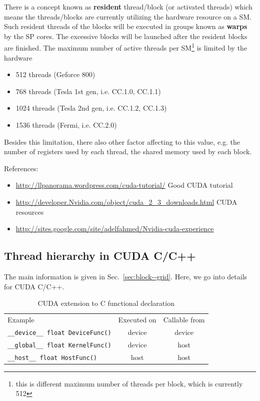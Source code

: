 There is a concept known as {\bf resident} thread/block (or activated
threads) which means the threads/blocks are currently utilizing the
hardware resource on a SM. Such resident threads of the blocks will be
executed in groups known as {\bf warps} by the SP cores. The excessive
blocks will be launched after the resident blocks are finished.  The
maximum number of active threads per
SM\footnote{this is different maximum number of threads per block,
  which is currently 512} is limited by the hardware
\begin{itemize}
\item 512 threads (Geforce 800)
\item 768 threads (Tesla 1st gen, i.e. CC.1.0, CC.1.1)
\item 1024 threads (Tesla 2nd gen, i.e. CC.1.2, CC.1.3)
\item 1536 threads (Fermi, i.e. CC.2.0)
\end{itemize}
Besides this limitation, there also other factor affecting to this
value, e.g. the number of registers used by each thread, the shared
memory used by each block. 

References:
\begin{itemize}
\item \url{http://llpanorama.wordpress.com/cuda-tutorial/} Good CUDA
  tutorial
\item \url{http://developer.Nvidia.com/object/cuda_2_3_downloads.html}
  CUDA resources
\item \url{http://sites.google.com/site/adelfahmed/Nvidia-cuda-experience}
\end{itemize}


\subsection{Thread hierarchy in CUDA C/C++}
\label{sec:cudac_thread-hierarchy}

The main information is given in Sec.~\ref{sec:block--grid}. Here, we go
into details for CUDA C/C++.

\begin{table}[hbt]
\begin{center}
\caption{CUDA extension to C functional declaration}
\begin{tabular}{lcc} 
\hline
Example & Executed on & Callable from \\ 
\verb!__device__ float DeviceFunc()! & device & device \\
\verb!__global__ float KernelFunc()! & device & host \\
\verb!__host__ float HostFunc()! & host & host  \\
\hline\hline
\end{tabular}
\end{center}
\label{tab:TabLabel}
\end{table}

